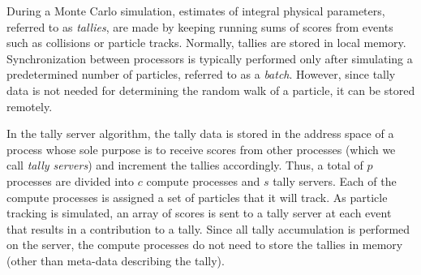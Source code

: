\documentclass{snamc2013}
\begin{document}
During a Monte Carlo simulation, estimates of integral physical parameters,
referred to as \emph{tallies}, are made by keeping running sums of scores from
events such as collisions or particle tracks. Normally, tallies are stored in
local memory. Synchronization between processors is typically performed only
after simulating a predetermined number of particles, referred to as a
\emph{batch}. However, since tally data is not needed for determining the random
walk of a particle, it can be stored remotely.

In the tally server algorithm, the tally data is stored in the address space of
a process whose sole purpose is to receive scores from other processes (which we
call \emph{tally servers}) and increment the tallies accordingly. Thus, a total
of $p$ processes are divided into $c$ compute processes and $s$ tally
servers. Each of the compute processes is assigned a set of particles that it
will track. As particle tracking is simulated, an array of scores is sent to a
tally server at each event that results in a contribution to a tally. Since all
tally accumulation is performed on the server, the compute processes do not need
to store the tallies in memory (other than meta-data describing the tally).
\end{document}

